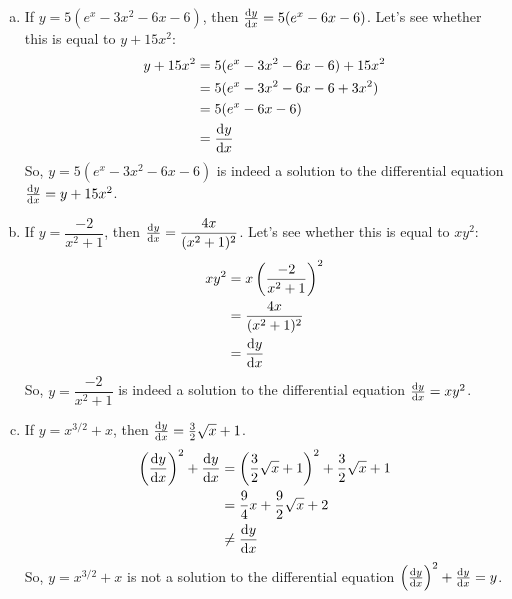 \begin{solution}
\begin{enumerate}[(a)]
\item If $y=5(e^x-3x^2-6x-6)$, then $\diff{y}{x} = 5(e^x-6x-6)$. Let's see whether this is equal to $y+15x^2$:
\begin{align*}
y+15x^2&=5(e^x-3x^2-6x-6)+15x^2\\
&=5(e^x-3x^2-6x-6+3x^2)\\
&=5(e^x-6x-6)\\
&=\diff{y}{x}
\end{align*}
So, $y=5(e^x-3x^2-6x-6)$ is indeed a solution to the differential equation $\diff{y}{x}=y+15x^2$.
%
\item If $y=\dfrac{-2}{x^2+1}$, then  $\diff{y}{x} = \dfrac{4x}{(x^2+1)^2}$. Let's see whether this is equal to $xy^2$:
\begin{align*}
xy^2&=x\left(\frac{-2}{x^2+1}\right)^2\\
&=\frac{4x}{(x^2+1)^2}\\
&=\diff{y}{x}
\end{align*}
So, $y=\dfrac{-2}{x^2+1}$ is indeed a solution to the differential equation $\diff{y}{x}=xy^2$.
%
\item If $y=x^{3/2}+x$, then  $\diff{y}{x} = \frac{3}{2}\sqrt{x}+1$.
\begin{align*}
\left(\diff{y}{x}\right)^2+\diff{y}{x}&=\left(\frac{3}{2}\sqrt{x}+1\right)^2+\frac{3}{2}\sqrt{x}+1\\
&=\frac{9}{4}x+\frac{9}{2}\sqrt{x}+2\\
&\neq \diff{y}{x}
\end{align*}
So, $y=x^{3/2}+x$ is not a solution to the differential equation $\left(\diff{y}{x}\right)^2+\diff{y}{x}=y$.
\end{enumerate}
\end{solution}

